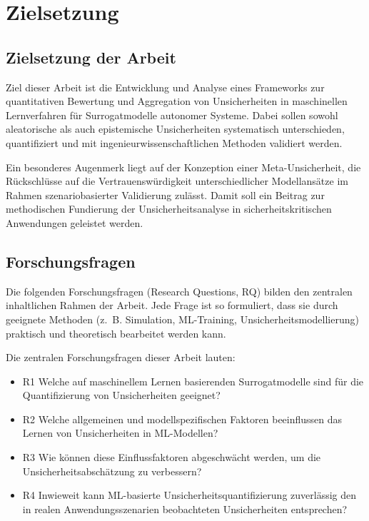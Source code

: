 
\chapter{Zielsetzung}
\label{chapter:zielsetzung}

\section{Zielsetzung der Arbeit}

Ziel dieser Arbeit ist die Entwicklung und Analyse eines Frameworks zur quantitativen Bewertung und Aggregation von Unsicherheiten in maschinellen Lernverfahren für Surrogatmodelle autonomer Systeme. Dabei sollen sowohl aleatorische als auch epistemische Unsicherheiten systematisch unterschieden, quantifiziert und mit ingenieurwissenschaftlichen Methoden validiert werden.

Ein besonderes Augenmerk liegt auf der Konzeption einer Meta-Unsicherheit, die Rückschlüsse auf die Vertrauenswürdigkeit unterschiedlicher Modellansätze im Rahmen szenariobasierter Validierung zulässt. Damit soll ein Beitrag zur methodischen Fundierung der Unsicherheitsanalyse in sicherheitskritischen Anwendungen geleistet werden.

\section{Forschungsfragen}

Die folgenden Forschungsfragen (Research Questions, RQ) bilden den zentralen inhaltlichen Rahmen der Arbeit. Jede Frage ist so formuliert, dass sie durch geeignete Methoden (z.~B. Simulation, ML-Training, Unsicherheitsmodellierung) praktisch und theoretisch bearbeitet werden kann. 

Die zentralen Forschungsfragen dieser Arbeit lauten:

\begin{itemize}
  \item {R1} Welche auf maschinellem Lernen basierenden Surrogatmodelle sind für die Quantifizierung von Unsicherheiten geeignet?
  \item {R2} Welche allgemeinen und modellspezifischen Faktoren beeinflussen das Lernen von Unsicherheiten in ML-Modellen?
  \item {R3} Wie können diese Einflussfaktoren abgeschwächt werden, um die Unsicherheitsabschätzung zu verbessern?
  \item {R4} Inwieweit kann ML-basierte Unsicherheitsquantifizierung zuverlässig den in realen Anwendungsszenarien beobachteten Unsicherheiten entsprechen?
\end{itemize}

